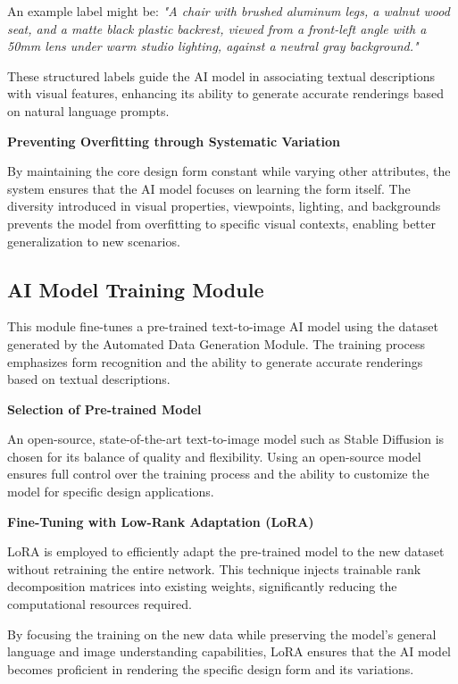 \documentclass{article}
\begin{document}
An example label might be: \textit{"A chair with brushed aluminum legs, a walnut wood seat, and a matte black plastic backrest, viewed from a front-left angle with a 50mm lens under warm studio lighting, against a neutral gray background."}

These structured labels guide the AI model in associating textual descriptions with visual features, enhancing its ability to generate accurate renderings based on natural language prompts.

\textbf{Preventing Overfitting through Systematic Variation}

By maintaining the core design form constant while varying other attributes, the system ensures that the AI model focuses on learning the form itself. The diversity introduced in visual properties, viewpoints, lighting, and backgrounds prevents the model from overfitting to specific visual contexts, enabling better generalization to new scenarios.

\subsection{AI Model Training Module}

This module fine-tunes a pre-trained text-to-image AI model using the dataset generated by the Automated Data Generation Module. The training process emphasizes form recognition and the ability to generate accurate renderings based on textual descriptions.

\textbf{Selection of Pre-trained Model}

An open-source, state-of-the-art text-to-image model such as Stable Diffusion is chosen for its balance of quality and flexibility. Using an open-source model ensures full control over the training process and the ability to customize the model for specific design applications.

\textbf{Fine-Tuning with Low-Rank Adaptation (LoRA)}

LoRA is employed to efficiently adapt the pre-trained model to the new dataset without retraining the entire network. This technique injects trainable rank decomposition matrices into existing weights, significantly reducing the computational resources required.

By focusing the training on the new data while preserving the model's general language and image understanding capabilities, LoRA ensures that the AI model becomes proficient in rendering the specific design form and its variations.
\end{document}

